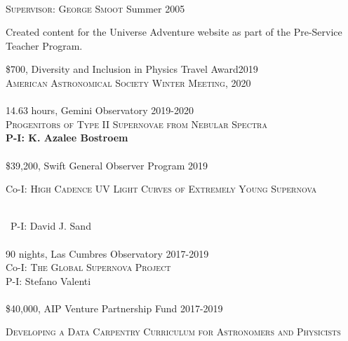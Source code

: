 \documentclass[10pt]{cv}
\begin{document}
\begin{llist}
\\
\textsc{Supervisor: George Smoot} \hfill Summer 2005\\
\begin{minipage}[l]{0.7\textwidth}\vspace{0.15cm}
Created content for the Universe Adventure website as part of the 
Pre-Service Teacher Program.\\
\end{minipage}
\vspace{-0.1in}   
\$700, Diversity and Inclusion in Physics Travel Award\hfill 2019\\
\textsc{American Astronomical Society Winter Meeting, 2020}\\
\\
14.63 hours, Gemini Observatory \hfill 2019-2020\\
\textsc{Progenitors of Type II Supernovae from Nebular Spectra}\\
\textbf{P-I: K. Azalee Bostroem}\\
\\
\$39,200, Swift General Observer Program \hfill 2019\\
\begin{minipage}[l]{0.7\textwidth}\vspace{0.15cm}
Co-I: \textsc{High Cadence UV Light Curves of Extremely Young Supernova}
\end{minipage}\vspace{0.15cm}\\\
P-I: David J. Sand\\
\\
90 nights, Las Cumbres Observatory \hfill 2017-2019\\
Co-I: \textsc{The Global Supernova Project}\\
P-I: Stefano Valenti \\
\\
\$40,000, AIP Venture Partnership Fund \hfill 2017-2019\\
\begin{minipage}[l]{0.7\textwidth}\vspace{0.15cm}
\textsc{Developing a Data Carpentry Curriculum for Astronomers and Physicists}
\end{minipage}\vspace{0.15cm}\\

\end{llist}
\end{document}
